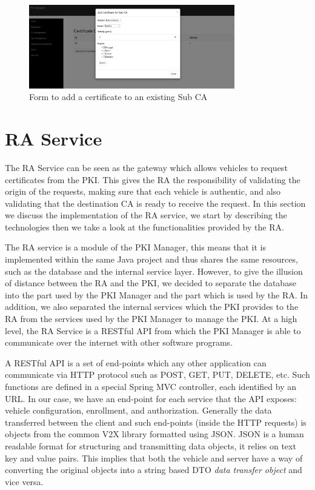 \begin{figure}[!h]
	\centering
	\includegraphics[width=0.8\textwidth]{Figures/manager8}
	\caption{\label{fig:manager8}Form to add a certificate to an existing Sub CA}
\end{figure}

\section{RA Service}
The RA Service can be seen as the gateway which allows vehicles to request certificates from the PKI. This gives the RA the responsibility of validating the origin of the requests, making sure that each vehicle is authentic, and also validating that the destination CA is ready to receive the request. In this section we discuss the implementation of the RA service, we start by describing the technologies then we take a look at the functionalities provided by the RA.

The RA service is a module of the PKI Manager, this means that it is implemented within the same Java project and thus shares the same resources, such as the database and the internal service layer. However, to give the illusion of distance between the RA and the PKI, we decided to separate the database into the part used by the PKI Manager and the part which is used by the RA. In addition, we also separated the internal services which the PKI provides to the RA from the services used by the PKI Manager to manage the PKI. At a high level, the RA Service is a RESTful API from which the PKI Manager is able to communicate over the internet with other software programs. 

A RESTful API is a set of end-points which any other application can communicate via HTTP protocol such as POST, GET, PUT, DELETE, etc. Such functions are defined in a special Spring MVC controller, each identified by an URL. In our case, we have an end-point for each service that the API exposes: vehicle configuration, enrollment, and authorization. Generally the data transferred between the client and such end-points (inside the HTTP requests) is objects from the common V2X library formatted using JSON. JSON is a human readable format for structuring and transmitting data objects, it relies on text key and value pairs. This implies that both the vehicle and server have a way of converting the original objects into a string based DTO \textit{data transfer object} and vice versa.


